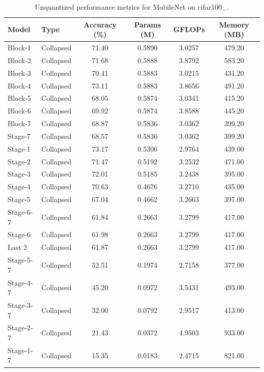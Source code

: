 \begin{table}
\caption{Unquantized performance metrics for MobileNet on cifar100_.}
\label{tab:MobileNet_cifar100__unquant}
\begin{tabular}{llcccc}
\toprule
Model & Type & Accuracy (\%) & Params (M) & GFLOPs & Memory (MB) \\
\midrule
Block-1 & Collapsed & 71.40 & 0.5890 & 3.0257 & 479.20 \\
Block-2 & Collapsed & 71.68 & 0.5888 & 3.8792 & 583.20 \\
Block-3 & Collapsed & 70.41 & 0.5883 & 3.0215 & 431.20 \\
Block-4 & Collapsed & 73.11 & 0.5883 & 3.8656 & 491.20 \\
Block-5 & Collapsed & 68.05 & 0.5874 & 3.0341 & 415.20 \\
Block-6 & Collapsed & 69.92 & 0.5874 & 3.8588 & 445.20 \\
Block-7 & Collapsed & 68.87 & 0.5836 & 3.0362 & 399.20 \\
Stage-7 & Collapsed & 68.57 & 0.5836 & 3.0362 & 399.20 \\
Stage-1 & Collapsed & 73.17 & 0.5306 & 2.9764 & 439.00 \\
Stage-2 & Collapsed & 71.47 & 0.5192 & 3.2532 & 471.00 \\
Stage-3 & Collapsed & 72.01 & 0.5185 & 3.2438 & 395.00 \\
Stage-4 & Collapsed & 70.63 & 0.4676 & 3.2710 & 435.00 \\
Stage-5 & Collapsed & 67.04 & 0.4662 & 3.2663 & 397.00 \\
Stage-6-7 & Collapsed & 61.84 & 0.2663 & 3.2799 & 417.00 \\
Stage-6 & Collapsed & 61.98 & 0.2663 & 3.2799 & 417.00 \\
Last 2 & Collapsed & 61.87 & 0.2663 & 3.2799 & 417.00 \\
Stage-5-7 & Collapsed & 52.51 & 0.1974 & 2.7158 & 377.00 \\
Stage-4-7 & Collapsed & 45.20 & 0.0972 & 3.5431 & 493.00 \\
Stage-3-7 & Collapsed & 32.00 & 0.0792 & 2.9517 & 413.00 \\
Stage-2-7 & Collapsed & 21.43 & 0.0372 & 4.9503 & 933.00 \\
Stage-1-7 & Collapsed & 15.35 & 0.0183 & 2.4715 & 821.00 \\
\bottomrule
\end{tabular}
\end{table}
